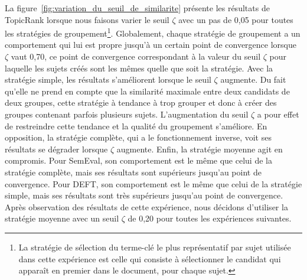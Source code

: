     La figure~\ref{fig:variation_du_seuil_de_similarite} présente les résultats
    de TopicRank lorsque nous faisons varier le seuil $\zeta$ avec un pas de
    0,05 pour toutes les stratégies de groupement\footnote{La stratégie de
    sélection du terme-clé le plus représentatif par sujet utilisée dans cette
    expérience est celle qui consiste à sélectionner le candidat qui apparaît en
    premier dans le document, pour chaque sujet.}.
    Globalement, chaque stratégie de groupement a un comportement qui lui est
    propre jusqu'à un certain point de convergence lorsque $\zeta$ vaut 0,70, ce
    point de convergence correspondant à la valeur du seuil $\zeta$ pour
    laquelle les sujets créés sont les mêmes quelle que soit la stratégie. Avec
    la stratégie simple, les résultats s'améliorent lorsque le seuil $\zeta$
    augmente. Du fait qu'elle ne prend en compte que la similarité maximale
    entre deux candidats de deux groupes, cette stratégie à tendance à trop
    grouper et donc à créer des groupes contenant parfois plusieurs sujets.
    L'augmentation du seuil $\zeta$ a pour effet de restreindre cette tendance
    et la qualité du groupement s'améliore. En opposition, la stratégie
    complète, qui a le fonctionnement inverse, voit ses résultats se dégrader
    lorsque $\zeta$ augmente. Enfin, la stratégie moyenne agit en compromis.
    Pour SemEval, son comportement est le même que celui de la stratégie
    complète, mais ses résultats sont supérieurs jusqu'au point de convergence.
    Pour DEFT, son comportement est le même que celui de la stratégie simple,
    mais ses résultats sont très supérieurs jusqu'au point de convergence.
    Après observation des résultats de cette expérience, nous décidons
    d'utiliser la stratégie moyenne avec un seuil $\zeta$ de 0,20 pour toutes
    les expériences suivantes.

